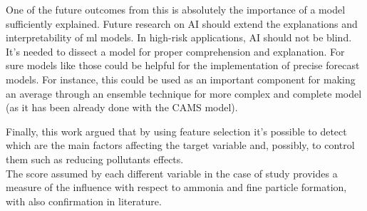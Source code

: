 One of the future outcomes from this is absolutely the importance of a model sufficiently explained.
Future research on AI should extend the explanations and interpretability of \acrshort{ml} models.
In high-risk applications, AI should not be blind. 
It's needed to dissect a model for proper comprehension and explanation.
For sure models like those could be helpful for the implementation of precise forecast models.  
For instance, this could be used as an important component for making an average through an ensemble technique for more complex and complete model (as it has been already done with the CAMS model).
\par
Finally, this work argued that by using feature selection it's possible to detect which are the main factors affecting the target variable and, possibly, to control them such as reducing pollutants effects.\\
The score assumed by each different variable in the case of study provides a measure of the influence with respect to ammonia and fine particle formation, with also confirmation in literature.
\begin{comment}
Looking forward, further attempts for reducing pollutant formation should be made by procedures actually used.
\end{comment}
